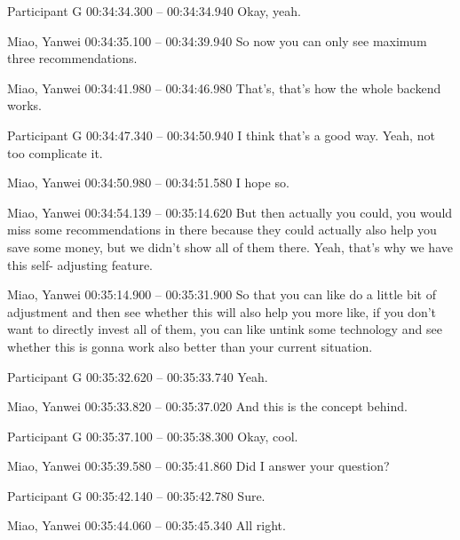 {Participant G 00:34:34.300 -- 00:34:34.940
Okay, yeah.

Miao, Yanwei 00:34:35.100 -- 00:34:39.940
So now you can only see maximum three recommendations.

Miao, Yanwei 00:34:41.980 -- 00:34:46.980
That's, that's how the whole backend works.

Participant G 00:34:47.340 -- 00:34:50.940
I think that's a good way. Yeah, not too complicate it.

Miao, Yanwei 00:34:50.980 -- 00:34:51.580
I hope so.

Miao, Yanwei 00:34:54.139 -- 00:35:14.620
But then actually you could, you would miss some recommendations in there because they could actually also help you save some money, but we didn't show all of them there. Yeah, that's why we have this self- adjusting feature.

Miao, Yanwei 00:35:14.900 -- 00:35:31.900
So that you can like do a little bit of adjustment and then see whether this will also help you more like, if you don't want to directly invest all of them, you can like untink some technology and see whether this is gonna work also better than your current situation.

Participant G 00:35:32.620 -- 00:35:33.740
Yeah.

Miao, Yanwei 00:35:33.820 -- 00:35:37.020
And this is the concept behind.

Participant G 00:35:37.100 -- 00:35:38.300
Okay, cool.

Miao, Yanwei 00:35:39.580 -- 00:35:41.860
Did I answer your question?

Participant G 00:35:42.140 -- 00:35:42.780
Sure.

Miao, Yanwei 00:35:44.060 -- 00:35:45.340
All right.
}